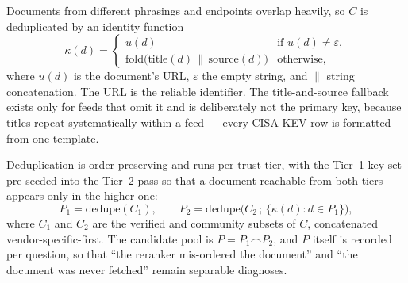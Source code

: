 \documentclass[acmsmall,review,anonymous,screen]{acmart}
\begin{document}
Documents from different phrasings and endpoints overlap heavily, so
$C$ is deduplicated by an identity function
\begin{equation}
\kappa(d) =
\begin{cases}
u(d) & \text{if } u(d) \neq \varepsilon,\\
\mathrm{fold}\big(\mathrm{title}(d) \,\|\, \mathrm{source}(d)\big) & \text{otherwise,}
\end{cases}
\label{eq:key}
\end{equation}
where $u(d)$ is the document's URL, $\varepsilon$ the empty string, and
$\|$ string concatenation. The URL is the reliable identifier. The
title-and-source fallback exists only for feeds that omit it and is
deliberately not the primary key, because titles repeat systematically
within a feed --- every CISA KEV row is formatted from one template.

Deduplication is order-preserving and runs per trust tier, with the
Tier~1 key set pre-seeded into the Tier~2 pass so that a document
reachable from both tiers appears only in the higher one:
\begin{equation}
P_1 = \mathrm{dedupe}(C_1), \qquad
P_2 = \mathrm{dedupe}\big(C_2 \,;\, \{\kappa(d) : d \in P_1\}\big),
\label{eq:tiers}
\end{equation}
where $C_1$ and $C_2$ are the verified and community subsets of $C$,
concatenated vendor-specific-first. The candidate pool is
$P = P_1 \frown P_2$, and $P$ itself is recorded per question, so that
``the reranker mis-ordered the document'' and ``the document was never
fetched'' remain separable diagnoses.
\end{document}
